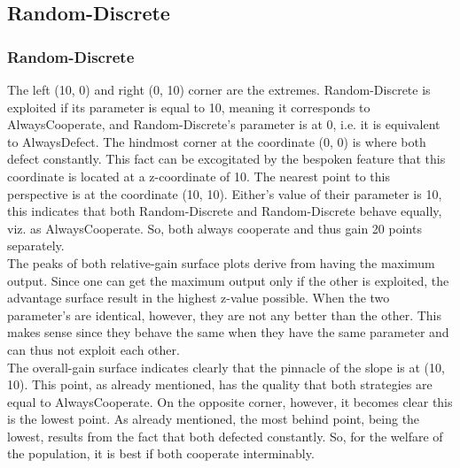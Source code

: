 \documentclass[11pt]{article}
\begin{document}
\subsection{Random-Discrete}

\subsubsection*{Random-Discrete}
		The left (10, 0) and right (0, 10) corner are the extremes.
		Random-Discrete is exploited if its parameter is equal to 10, meaning it corresponds to AlwaysCooperate, and Random-Discrete's parameter is at 0, i.e. it is equivalent to AlwaysDefect.
		The hindmost corner at the coordinate (0, 0) is where both defect constantly.
		This fact can be excogitated by the bespoken feature that this coordinate is located at a z-coordinate of 10.
		The nearest point to this perspective is at the coordinate (10, 10).
		Either's value of their parameter is 10, this indicates that both Random-Discrete and Random-Discrete behave equally, viz. as AlwaysCooperate.
		So, both always cooperate and thus gain 20 points separately.\\

		The peaks of both relative-gain surface plots derive from having the maximum output.
		Since one can get the maximum output only if the other is exploited, the advantage surface result in the highest z-value possible.
		When the two parameter's are identical, however, they are not any better than the other.
		This makes sense since they behave the same when they have the same parameter and can thus not exploit each other.\\

		The overall-gain surface indicates clearly that the pinnacle of the slope is at (10, 10).
		This point, as already mentioned, has the quality that both strategies are equal to AlwaysCooperate.
		On the opposite corner, however, it becomes clear this is the lowest point.
		As already mentioned, the most behind point, being the lowest, results from the fact that both defected constantly.
		So, for the welfare of the population, it is best if both cooperate interminably.\\
\end{document}
